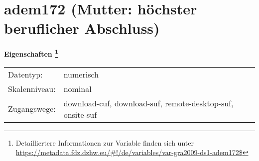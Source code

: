 
    \setcounter{footnote}{0}

    \vspace*{-1.8cm}
	\section{adem172 (Mutter: höchster beruflicher Abschluss)}
	\label{section:adem172}



    \vspace*{0.5cm}
    \noindent\textbf{Eigenschaften
	\footnote{Detailliertere Informationen zur Variable finden sich unter
		\url{https://metadata.fdz.dzhw.eu/\#!/de/variables/var-gra2009-ds1-adem172$}}}\\
	\begin{tabularx}{\hsize}{@{}lX}
	Datentyp: & numerisch \\
	Skalenniveau: & nominal \\
	Zugangswege: &
	  download-cuf, 
	  download-suf, 
	  remote-desktop-suf, 
	  onsite-suf
 \\
    \end{tabularx}




